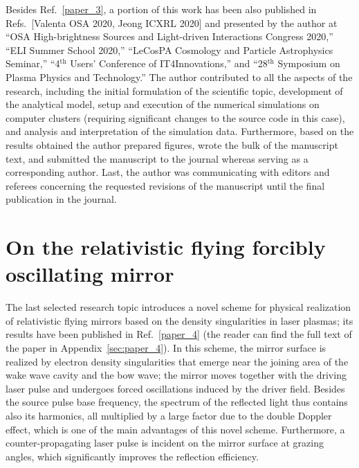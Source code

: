 \documentclass[10pt, a4paper, twoside, openright]{report}
\newcommand{\q}[1]{``#1''} %
\begin{document}
Besides Ref.~\ref{paper_3}, a portion of this work has been also published in Refs.~[Valenta OSA 2020, Jeong ICXRL 2020] and presented by the author at \q{OSA High-brightness Sources and Light-driven Interactions Congress 2020,} \q{ELI Summer School 2020,} \q{LeCosPA Cosmology and Particle Astrophysics Seminar,} \q{4$ ^{\mathrm{th}} $ Users' Conference of IT4Innovations,} and \q{28$ ^{\mathrm{th}} $ Symposium on Plasma Physics and Technology.} The author contributed to all the aspects of the research, including the initial formulation of the scientific topic, development of the analytical model, setup and execution of the numerical simulations on computer clusters (requiring significant changes to the source code in this case), and analysis and interpretation of the simulation data. Furthermore, based on the results obtained the author prepared figures, wrote the bulk of the manuscript text, and submitted the manuscript to the journal whereas serving as a corresponding author. Last, the author was communicating with editors and referees concerning the requested revisions of the manuscript until the final publication in the journal.


\section{On the relativistic flying forcibly oscillating mirror\label{sec:on_the_relativistic_flying_forcibly_oscillating_mirror}}
%

The last selected research topic introduces a novel scheme for physical realization of relativistic flying mirrors based on the density singularities in laser plasmas; its results have been published in Ref.~\ref{paper_4} (the reader can find the full text of the paper in Appendix~\ref{sec:paper_4}). In this scheme, the mirror surface is realized by electron density singularities that emerge near the joining area of the wake wave cavity and the bow wave; the mirror moves together with the driving laser pulse and undergoes forced oscillations induced by the driver field. Besides the source pulse base frequency, the spectrum of the reflected light thus contains also its harmonics, all multiplied by a large factor due to the double Doppler effect, which is one of the main advantages of this novel scheme. Furthermore, a counter-propagating laser pulse is incident on the mirror surface at grazing angles, which significantly improves the reflection efficiency.
\end{document}
